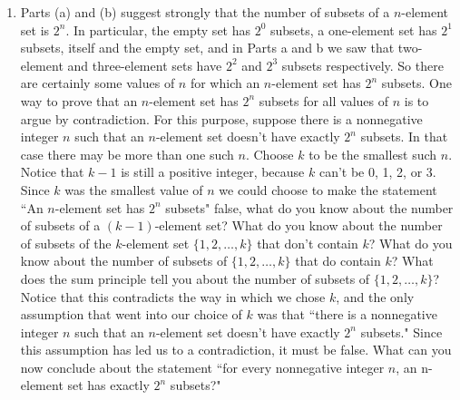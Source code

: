 \begin{enumerate}
\item Parts (a) and (b) suggest
strongly that the number of subsets of a $n$-element set is $2^n$. In
particular, the empty set has $2^0$ subsets, a one-element set has $2^1$
subsets, itself and the empty set, and in Parts a and b we saw that
two-element and three-element sets have $2^2$ and $2^3$ subsets
respectively. So there are certainly some values of $n$ for which an
$n$-element set has $2^n$ subsets. One way to prove that an $n$-element
set has $2^n$ subsets for all values of $n$ is to argue by contradiction.
For this purpose, suppose there is a nonnegative integer $n$ such that an
$n$-element set doesn't have exactly $2^n$ subsets. In that case there may
be more than one such $n$. Choose $k$ to be the smallest such $n$. Notice
that $ k -1$ is still a positive integer, because $k$ can't be 0, 1, 2,
or 3. Since $k$ was the smallest value of $n$ we could choose to make the
statement
``An $n$-element set has $2^n$ subsets" false, what do you know about the
number of subsets of a $(k - 1)$-element set? What do you know about the
number of subsets of the $k$-element set $\{ 1, 2, \ldots, k \}$ that
don't contain $k$? What do you know about the number of subsets of $\{ 1,
2, \ldots,  k \}$ that do contain $k$? What does the sum principle tell
you about the number of subsets of $\{ 1, 2, \ldots, k \}$? Notice that
this contradicts the way in which we chose $k$, and the only assumption
that went into our choice of $k$ was that ``there is a nonnegative integer
$n$ such that an $n$-element set doesn't have exactly $2^n$ subsets."
Since this assumption has led us to a contradiction, it must be false.
What can you now conclude about the statement ``for every nonnegative
integer $n$, an n-element set has exactly $2^n$ subsets?"
\end{enumerate}

